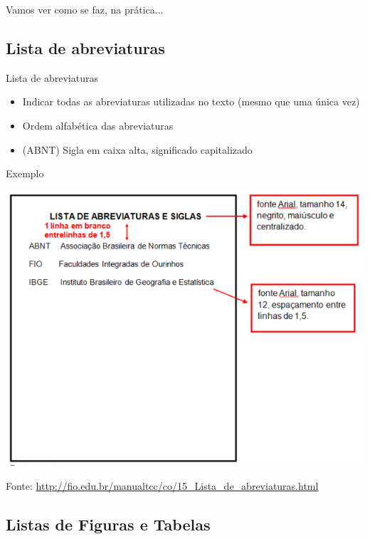 \documentclass{beamer}
\begin{document}
\begin{frame}{}
  \begin{block}{}
    \Large
    Vamos ver como se faz, na prática...
  \end{block}
\end{frame}

\subsection{Lista de abreviaturas}

\begin{frame}{Lista de abreviaturas}
  \begin{itemize}
  \item Indicar \alert{todas} as abreviaturas utilizadas no texto
    (mesmo que uma única vez)
  \item Ordem alfabética das abreviaturas
  \item (ABNT) Sigla em caixa alta, significado capitalizado
  \end{itemize}
\end{frame}

\begin{frame}{Exemplo}
  \begin{center}
    \includegraphics[height=0.8\textheight]{ProjetoII/lista_abreviaturas}
  \end{center}

  Fonte: \url{http://fio.edu.br/manualtcc/co/15_Lista_de_abreviaturas.html}
\end{frame}

\subsection{Listas de Figuras e Tabelas}
\end{document}
